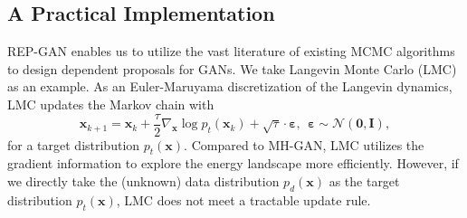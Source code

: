 \documentclass[runningheads]{llncs}
\newcommand{\bx}{\mathbf{x}}
\newcommand{\bI}{\mathbf{I}}
\newcommand{\bvarepsilon}{\bm{\varepsilon}}
\newcommand{\cN}{\mathcal{N}}
\newcommand{\cX}{\mathcal{X}}
\newcommand{\cZ}{\mathcal{Z}}
\newcommand{\bzero}{\mathbf{0}}
\newcommand{\<}{\left\langle}
\renewcommand{\>}{\right\rangle}
\begin{document}



\subsection{A Practical Implementation}
\label{sec:proposal}
REP-GAN enables us to utilize the vast literature of existing MCMC algorithms \cite{neal2010MCMC} to design dependent proposals for GANs. We take Langevin Monte Carlo (LMC) as an example.
As an Euler-Maruyama discretization of the Langevin dynamics, LMC updates the Markov chain with
\begin{equation}
    \bx_{k+1}=\bx_k+\frac{\tau}{2}\nabla_{\bx}\log p_t(\bx_k)+\sqrt{\tau}\cdot\bvarepsilon,~~\bvarepsilon\sim\cN(\bzero,\bI),
\end{equation}
for a target distribution $p_t(\bx)$. Compared to MH-GAN, LMC utilizes the gradient information to explore the energy landscape more efficiently. However, if we directly take the (unknown) data distribution $p_d(\bx)$ as the target distribution $p_t(\bx)$, LMC does not meet a tractable update rule. 
\end{document}
